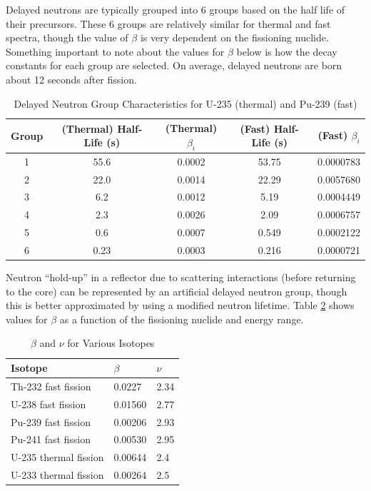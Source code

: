\documentclass[10pt]{article}
\begin{document}
\begin{flushleft}
Delayed neutrons are typically grouped into 6 groups based on the half life of their precursors. These 6 groups are relatively similar for thermal and fast spectra, though the value of \(\beta\) is very dependent on the fissioning nuclide. Something important to note about the values for \(\beta\) below is how the decay constants for each group are selected. On average, delayed neutrons are born about 12 seconds after fission. 

\begin{table}[h]
\caption{Delayed Neutron Group Characteristics for U-235 (thermal) and Pu-239 (fast)} %
\centering %
\begin{tabular}{c |c c |c c} %
\hline\hline %
 Group & (Thermal) Half-Life (s) & (Thermal) \(\beta_i\) & (Fast) Half-Life (s) & (Fast) \(\beta_i\)
\\ [0.5ex]
\hline %
1 & 55.6 & 0.0002 & 53.75 & 0.0000783\\
2 & 22.0 & 0.0014 & 22.29 & 0.0057680\\
3 & 6.2  & 0.0012 &  5.19 & 0.0004449\\
4 & 2.3  & 0.0026 &  2.09 & 0.0006757\\
5 & 0.6  & 0.0007 & 0.549 & 0.0002122\\
6 & 0.23 & 0.0003 & 0.216 & 0.0000721\\
\hline %
\end{tabular}
\label{tab:PPer}
\end{table}

Neutron ``hold-up'' in a reflector due to scattering interactions (before returning to the core) can be represented by an artificial delayed neutron group, though this is better approximated by using a modified neutron lifetime. Table \ref{tab:PPer} shows values for \(\beta\) as a function of the fissioning nuclide and energy range.

\begin{table}[H] 
\caption{\(\beta\) and \(\nu\) for Various Isotopes} %
\centering %
\begin{tabular}{l l l} %
\hline\hline %
 Isotope & \(\beta\) & \(\nu\)
\\ [0.5ex]
\hline %
Th-232 fast fission & 0.0227 & 2.34\\
U-238 fast fission & 0.01560 & 2.77\\
Pu-239 fast fission & 0.00206 & 2.93\\
Pu-241 fast fission & 0.00530 & 2.95\\
U-235 thermal fission & 0.00644 & 2.4\\
U-233 thermal fission & 0.00264 & 2.5\\
\hline %
\end{tabular}
\label{tab:PPer}
\end{table}


\end{flushleft}
\end{document}
